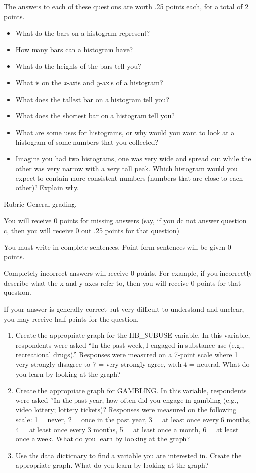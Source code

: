 \documentclass[
]{book}
\providecommand{\tightlist}{%
  \setlength{\itemsep}{0pt}\setlength{\parskip}{0pt}}
\begin{document}
The answers to each of these questions are worth .25 points each, for a total of 2 points.

\begin{itemize}
\tightlist
\item
  What do the bars on a histogram represent?
\item
  How many bars can a histogram have?
\item
  What do the heights of the bars tell you?
\item
  What is on the \emph{x}-axis and \emph{y}-axis of a histogram?
\item
  What does the tallest bar on a histogram tell you?
\item
  What does the shortest bar on a histogram tell you?
\item
  What are some uses for histograms, or why would you want to look at a histogram of some numbers that you collected?
\item
  Imagine you had two histograms, one was very wide and spread out while the other was very narrow with a very tall peak. Which histogram would you expect to contain more consistent numbers (numbers that are close to each other)? Explain why.
\end{itemize}

Rubric
General grading.

You will receive 0 points for missing answers (say, if you do not answer question c, then you will receive 0 out .25 points for that question)

You must write in complete sentences. Point form sentences will be given 0 points.

Completely incorrect answers will receive 0 points. For example, if you incorrectly describe what the x and y-axes refer to, then you will receive 0 points for that question.

If your answer is generally correct but very difficult to understand and unclear, you may receive half points for the question.

\begin{enumerate}
\def\labelenumi{\arabic{enumi}.}
\setcounter{enumi}{1}
\item
  Create the appropriate graph for the HB\_SUBUSE variable. In this variable, respondents were asked ``In the past week, I engaged in substance use (e.g., recreational drugs).'' Responses were measured on a 7-point scale where 1 = very strongly disagree to 7 = very strongly agree, with 4 = neutral. What do you learn by looking at the graph?
\item
  Create the appropriate graph for GAMBLING. In this variable, respondents were asked ``In the past year, how often did you engage in gambling (e.g., video lottery; lottery tickets)? Responses were measured on the following scale: 1 = never, 2 = once in the past year, 3 = at least once every 6 months, 4 = at least once every 3 months, 5 = at least once a month, 6 = at least once a week. What do you learn by looking at the graph?
\item
  Use the data dictionary to find a variable you are interested in. Create the appropriate graph. What do you learn by looking at the graph?
\end{enumerate}
\end{document}
